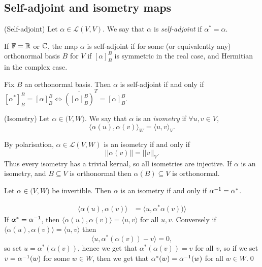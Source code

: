 \documentclass{article}
\newcommand{\F}{\mathbb{F}}
\begin{document}
\subsection{Self-adjoint and isometry maps}
\begin{definition}
	(Self-adjoint) Let $ \alpha\in \mathcal L(V,V)$. We say that $ \alpha $ is \textit{self-adjoint} if $ \alpha^*=\alpha $.
\end{definition}
\begin{lemma}
	If $ \F=\R $ or $ \mathbb{C} $, the map $ \alpha $ is self-adjoint if for some (or equivalently any) orthonormal basis $ B $ for $ V $ if $ [\alpha]^B_B $ is symmetric in the real case, and Hermitian in the complex case.
\end{lemma}
\pf Fix $ B $ an orthonormal basis. Then $ \alpha $ is self-adjoint if and only if $ [\alpha^*]^B_B=[\alpha]^B_B\iff \overline{([\alpha]_B^B)}^T=[\alpha]^B_B $.
\begin{definition}
	(Isometry) Let $ \alpha\in\mathcal (V,W) $. We say that $ \alpha $ is an \textit{isometry} if $ \forall u,v\in V $,
	\[
	  \langle \alpha(u),\alpha(v)\rangle_W=\langle u,v\rangle_V.
	\]
\end{definition}
\begin{remark}
  By polarisation, $ \alpha\in\mathcal L(V,W) $ is an isometry if and only if
  \[
    ||\alpha(v)||=||v||_V.
  \]
  Thus every isometry has a trivial kernal, so all isometries are injective. If $ \alpha $ is an isometry, and $ B\subseteq V $ is orthonormal then $ \alpha(B)\subseteq V $ is orthonormal.
\end{remark}
\begin{proposition}
  Let $ \alpha\in \mathcal(V,W) $ be invertible. Then $ \alpha $ is an isometry if and only if $ {\alpha}^{-1}=\alpha^* $.
\end{proposition}
\pf \begin{align*}
	\langle\alpha(u),\alpha(v)\rangle&=\langle u,\alpha^*\alpha(v))\rangle
\end{align*}
If $ \alpha^*={\alpha}^{-1} $, then $ \langle\alpha(u),\alpha(v)\rangle =\langle u,v\rangle $ for all $ u,v $. Conversely if $ \langle \alpha(u),\alpha(v)\rangle=\langle u,v\rangle $ then
\[
	\langle u,\alpha^*(\alpha(v))-v\rangle=0,
\]
so set $ u=\alpha^*(\alpha(v)) $, hence we get that $ \alpha^*(\alpha(v))=v $ for all $ v $, so if we set $ v={\alpha}^{-1}(w) $ for some $ w\in W $, then we get that $ \alpha^*(w)={\alpha}^{-1}(w) $ for all $ w\in W $.\qed
\end{document}
